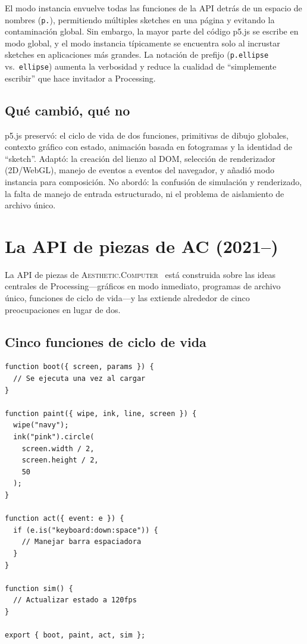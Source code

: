 \documentclass[10pt,letterpaper,twocolumn]{article}
\newcommand{\ac}{\textsc{Aesthetic.Computer}}
\begin{document}
El modo instancia envuelve todas las funciones de la API detrás de un espacio de nombres (\texttt{p.}), permitiendo múltiples sketches en una página y evitando la contaminación global. Sin embargo, la mayor parte del código p5.js se escribe en modo global, y el modo instancia típicamente se encuentra solo al incrustar sketches en aplicaciones más grandes. La notación de prefijo (\texttt{p.ellipse} vs.\ \texttt{ellipse}) aumenta la verbosidad y reduce la cualidad de ``simplemente escribir'' que hace invitador a Processing.

\subsection{Qué cambió, qué no}

p5.js preservó: el ciclo de vida de dos funciones, primitivas de dibujo globales, contexto gráfico con estado, animación basada en fotogramas y la identidad de ``sketch''. Adaptó: la creación del lienzo al DOM, selección de renderizador (2D/WebGL), manejo de eventos a eventos del navegador, y añadió modo instancia para composición. No abordó: la confusión de simulación y renderizado, la falta de manejo de entrada estructurado, ni el problema de aislamiento de archivo único.


\section{La API de piezas de AC (2021--)}
\label{sec:ac}

La API de piezas de \ac{}~\citep{scudder2026ac} está construida sobre las ideas centrales de Processing---gráficos en modo inmediato, programas de archivo único, funciones de ciclo de vida---y las extiende alrededor de cinco preocupaciones en lugar de dos.

\subsection{Cinco funciones de ciclo de vida}

\begin{lstlisting}[style=acjsstyle,caption={Pieza mínima de AC.}]
function boot({ screen, params }) {
  // Se ejecuta una vez al cargar
}

function paint({ wipe, ink, line, screen }) {
  wipe("navy");
  ink("pink").circle(
    screen.width / 2,
    screen.height / 2,
    50
  );
}

function act({ event: e }) {
  if (e.is("keyboard:down:space")) {
    // Manejar barra espaciadora
  }
}

function sim() {
  // Actualizar estado a 120fps
}

export { boot, paint, act, sim };
\end{lstlisting}
\end{document}
